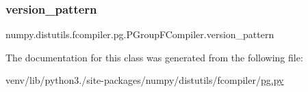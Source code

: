 \subsubsection{\texorpdfstring{version\+\_\+pattern}{version\_pattern}}
{\footnotesize\ttfamily numpy.\+distutils.\+fcompiler.\+pg.\+P\+Group\+F\+Compiler.\+version\+\_\+pattern\hspace{0.3cm}{\ttfamily [static]}}



The documentation for this class was generated from the following file\+:\begin{DoxyCompactItemize}
\item 
venv/lib/python3./site-\/packages/numpy/distutils/fcompiler/\hyperlink{pg_8py}{pg.\+py}\end{DoxyCompactItemize}

